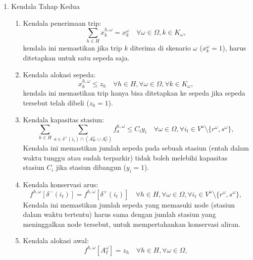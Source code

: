 \begin{enumerate}
    
    \item Kendala Tahap Kedua
    \begin{enumerate}
        \item [a.]  Kendala penerimaan trip:
    \begin{equation}
    \sum_{h \in H} x_k^{h,\omega} = x_k^\omega \quad \forall \omega \in \Omega, k \in K_\omega,
    \end{equation}
    kendala ini memastikan jika trip $k$ diterima di skenario $\omega$ ($x_k^\omega = 1$), harus ditetapkan untuk satu sepeda saja.\\
        \item [b.] Kendala alokasi sepeda:
    \begin{equation}
    x_k^{h,\omega} \leq z_h \quad \forall h \in H, \forall \omega \in \Omega, \forall k \in K_\omega,
    \end{equation}
    kendala ini memastikan trip hanya bisa ditetapkan ke sepeda jika sepeda tersebut telah dibeli ($z_h = 1$).\\
        \item [c.] Kendala kapasitas stasiun:
    \begin{equation}
    \sum_{h \in H} \sum_{a \in \delta^+(i_t) \cap (A_W^\omega \cup A_C^\omega)} f_a^{h,\omega} \leq C_i y_i \quad \forall \omega \in \Omega, \forall i_t \in V^\omega \setminus \{r^\omega, s^\omega\},
    \end{equation}
    Kendala ini memastikan jumlah sepeda pada sebuah stasiun (entah dalam waktu tunggu atau sudah terparkir) tidak boleh melebihi kapasitas stasiun $C_i$ jika stasiun dibangun ($y_i = 1$).\\
        \item [d.] Kendala konservasi arus:
    \begin{equation}
    f^{h,\omega}[\delta^-(i_t)] = f^{h,\omega}[\delta^+(i_t)] \quad \forall h \in H, \forall \omega \in \Omega, \forall i_t \in V^\omega \setminus \{r^\omega, s^\omega\},
    \end{equation}
    Kendala ini memastikan jumlah sepeda yang memasuki  node (stasiun dalam waktu tertentu) harus sama dengan jumlah stasiun yang meninggalkan node tersebut, untuk mempertahankan konservasi aliran.\\
        \item [e.] Kendala alokasi awal:
    \begin{equation}
    f^{h,\omega}[A_I^\omega] = z_h \quad \forall h \in H, \forall \omega \in \Omega,
    \end{equation}

\end{enumerate}
\end{enumerate}
